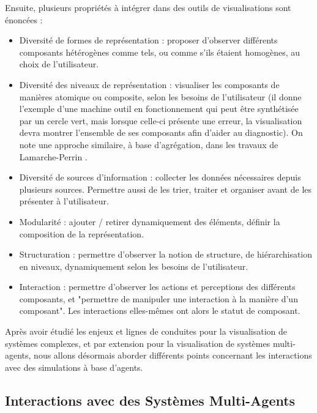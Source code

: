 		Ensuite, plusieurs propriétés à intégrer dans des outils de visualisations sont énoncées :
		\begin{itemize}
			\item Diversité de formes de représentation : proposer d'observer différents composants hétérogènes comme tels, ou comme s'ils étaient homogènes, au choix de l'utilisateur.
			\item Diversité des niveaux de représentation : visualiser les composants de manières atomique ou composite, selon les besoins de l'utilisateur (il donne l'exemple d'une machine outil en fonctionnement qui peut être synthétisée par un cercle vert, mais lorsque celle-ci présente une erreur, la visualisation devra montrer l'ensemble de ses composants afin d'aider au diagnostic). On note une approche similaire, à base d'agrégation, dans les travaux de Lamarche-Perrin \cite{lamarche-perrin_analyse_2013}.
			\item Diversité de sources d'information : collecter les données nécessaires depuis plusieurs sources. Permettre aussi de les trier, traiter et organiser avant de les présenter à l'utilisateur.
			\item Modularité : ajouter / retirer dynamiquement des éléments, définir la composition de la représentation.
			\item Structuration : permettre d'observer la notion de structure, de hiérarchisation en niveaux, dynamiquement selon les besoins de l'utilisateur.
			\item Interaction : permettre d'observer les actions et perceptions des différents composants, et "permettre de manipuler une interaction à la manière d'un composant". Les interactions elles-mêmes ont alors le statut de composant.
		\end{itemize}
		
		Après avoir étudié les enjeux et lignes de conduites pour la visualisation de systèmes complexes, et par extension pour la visualisation de systèmes multi-agents, nous allons désormais aborder différents points concernant les interactions avec des simulations à base d'agents.
		
		\subsection{Interactions avec des Systèmes Multi-Agents}
	
